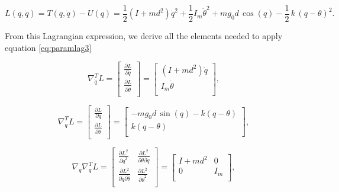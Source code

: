 \documentclass[a4paper]{article}
\begin{document}
\begin{equation}
    \nonumber
    L(q,\dot{q}) = T(q,\dot{q}) - U(q) = \frac{1}{2}(I+md^2)\dot{q}^2 + \frac{1}{2} I_m \dot{\theta}^2 + mg_0d\, \cos(q) - \frac{1}{2}\,k\,(q-\theta)^{2}.
\end{equation}

From this Lagrangian expression, we derive all the elements needed to apply equation \eqref{eq:paramlag3}

\begin{equation}
    \nonumber
    \nabla_{\dot{q}}^{T} L = 
    \begin{bmatrix}
        \frac{\partial L}{\partial \dot{q}} \\[3mm]
        \frac{\partial L}{\partial \dot{\theta}} \\
    \end{bmatrix} =
    \begin{bmatrix}
        (I+md^2)\dot{q}\\[1mm]
        I_m\dot{\theta}\\
    \end{bmatrix},
\end{equation}

\begin{equation}
    \nonumber
    \nabla_{\dot{q}}^{T} L = 
    \begin{bmatrix}
        \frac{\partial L}{\partial q} \\[3mm]
        \frac{\partial L}{\partial \theta} \\
    \end{bmatrix} =
    \begin{bmatrix}
        -mg_0d\,\sin(q) - k(q-\theta) \\
        k(q-\theta)\\
    \end{bmatrix},
\end{equation}

\begin{equation}
    \nonumber
    \nabla_{\dot{q}} \nabla_{\dot{q}}^{T} L =
    \begin{bmatrix}
        \frac{\partial L^2}{\partial \dot{q}^2} & \frac{\partial L^2}{\partial \dot{\theta} \partial \dot{q}} \\
        \frac{\partial L^2}{\partial \dot{q} \partial \dot{\theta}} & \frac{\partial L^2}{\partial \dot{\theta}^2} \\
    \end{bmatrix} =
    \begin{bmatrix}
        I+md^2 & 0 \\
        0 & I_m \\
    \end{bmatrix},
\end{equation}
\end{document}

